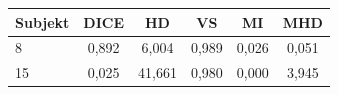 \begin{tabular}{l c c c c c}
 \hline
Subjekt & DICE & HD & VS & MI & MHD \\ \hline
8 & 0,892 & 6,004 & 0,989 & 0,026 & 0,051 \\
15 & 0,025 & 41,661 & 0,980 & 0,000 & 3,945 \\
\hline 
 \end{tabular}
